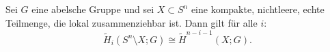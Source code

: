 \begin{satz}
    Sei $G$ eine abelsche Gruppe und sei $X \subset S^n$ eine kompakte,
    nichtleere, echte Teilmenge, die lokal zusammenziehbar ist.
    Dann gilt für alle $i$:
    \[
        \tilde{H}_i(S^n \setminus X; G) \cong \tilde{H}^{n-i-1}(X; G).
    \]
\end{satz}